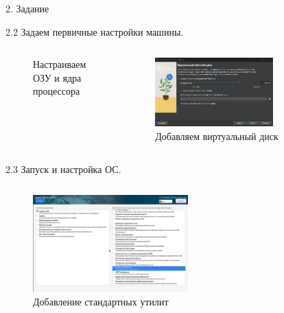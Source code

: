 \documentclass[
  ignorenonframetext,
  aspectratio=169,
]{beamer}
\begin{document}
\begin{frame}{2. Задание}
\begin{block}{2.2 Задаем первичные настройки машины.}
\begin{columns}[c]
\begin{figure}
{}

\caption{Настраиваем ОЗУ и ядра процессора}

\end{figure}%
\begin{figure}

{\centering \includegraphics[width=0.7\textwidth,height=\textheight]{image/3.png}

}

\caption{Добавляем виртуальный диск}

\end{figure}%
\end{columns}
\end{block}

\begin{block}{2.3 Запуск и настройка ОС.}
\label{ux437ux430ux43fux443ux441ux43a-ux438-ux43dux430ux441ux442ux440ux43eux439ux43aux430-ux43eux441.}
\begin{columns}[c]
\begin{figure}

{\centering \includegraphics[width=0.7\textwidth,height=\textheight]{image/6.png}

}

\caption{Добавление стандартных утилит}

\end{figure}%
\begin{figure}


\end{figure}
\end{columns}
\end{block}
\end{frame}
\end{document}

